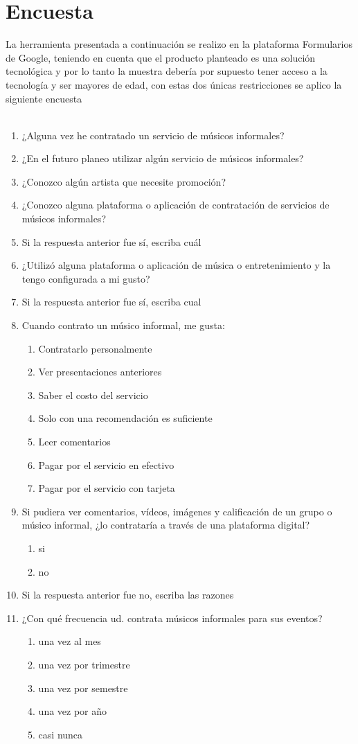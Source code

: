 \section{Encuesta}
La herramienta presentada a continuación se realizo en la plataforma Formularios de Google, teniendo en cuenta que el producto planteado es una solución tecnológica y por lo tanto la muestra debería por supuesto tener acceso a la tecnología y ser mayores de edad, con estas dos únicas restricciones se aplico la siguiente encuesta\\
\\
\begin{enumerate}
\item ¿Alguna vez he contratado un servicio de músicos informales?
\item  ¿En el futuro planeo utilizar algún servicio de músicos informales?
\item  ¿Conozco algún artista que necesite promoción?
\item  ¿Conozco alguna plataforma o aplicación de contratación de servicios de músicos informales?
\item  Si la respuesta anterior fue sí, escriba cuál
\item  ¿Utilizó alguna plataforma o aplicación de música o entretenimiento y la tengo configurada a mi gusto?
\item  Si la respuesta anterior fue sí, escriba cual
\item  Cuando contrato un músico informal, me gusta:
    \begin{enumerate}
    \item Contratarlo personalmente
    \item Ver presentaciones anteriores
    \item Saber el costo del servicio
    \item Solo con una recomendación es suficiente
    \item Leer comentarios
    \item Pagar por el servicio en efectivo
    \item Pagar por el servicio con tarjeta
    \end{enumerate}
\item  Si pudiera ver comentarios, vídeos, imágenes y calificación de un grupo o músico informal, ¿lo contrataría a través de una plataforma digital?
    \begin{enumerate}
    \item si
    \item no
    \end{enumerate}
\item  Si la respuesta anterior fue no, escriba las razones
\item  ¿Con qué frecuencia ud. contrata músicos informales para sus eventos?
    \begin{enumerate}
    \item una vez al mes
    \item una vez por trimestre
    \item una vez por semestre
    \item una vez por año
    \item casi nunca
    \end{enumerate}
\end{enumerate}
